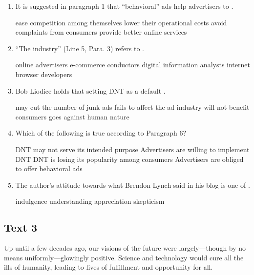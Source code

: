 \begin{enumerate}[resume]
	\item
 It is suggested in paragraph 1 that ``behavioral'' ads help
advertisers to \lineread.


\fourchoices
{ease competition among themselves}
{lower their operational costs}
{avoid complaints from consumers}
{provide better online services}


\item
``The industry'' (Line 5, Para. 3) refers to \lineread.


\fourchoices
{online advertisers}
{e-commerce conductors}
{digital information analysts}
{internet browser developers}



\item
Bob Liodice holds that setting DNT as a default \lineread.


\fourchoices
{may cut the number of junk ads}
{fails to affect the ad industry}
{will not benefit consumers}
{goes against human nature}


\item
 Which of the following is true according to Paragraph 6?


\fourchoices
{DNT may not serve its intended purpose}
{Advertisers are willing to implement DNT}
{DNT is losing its popularity among consumers}
{Advertisers are obliged to offer behavioral ads}





\item
The author's attitude towards what Brendon Lynch said in his
blog is one of \lineread.


\fourchoices
{indulgence}
{understanding}
{appreciation}
{skepticism}


\end{enumerate}


\newpage
\subsection{Text 3}


Up until a few decades ago, our visions of the future were
largely---though by no means uniformly---glowingly positive. Science and
technology would cure all the ills of humanity, leading to lives of
fulfillment and opportunity for all.

